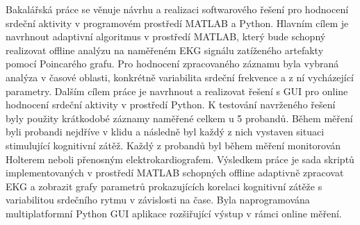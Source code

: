 Bakalářská práce se věnuje návrhu a realizaci softwarového řešení pro hodnocení
srdeční aktivity v programovém prostředí MATLAB a Python. Hlavním cílem je
navrhnout adaptivní algoritmus v prostředí MATLAB, který bude schopný realizovat
offline analýzu na naměřeném EKG signálu zatíženého artefakty pomocí Poincarého
grafu. Pro hodnocení zpracovaného záznamu byla vybraná analýza v časové oblasti,
konkrétně variabilita srdeční frekvence a z ní vycházející parametry. Dalším
cílem práce je navrhnout a realizovat řešení s GUI pro online hodnocení srdeční
aktivity v prostředí Python. K testování navrženého řešení byly použity
krátkodobé záznamy naměřené celkem u 5 probandů. Během měření byli probandi
nejdříve v klidu a následně byl každý z nich vystaven situaci stimulující
kognitivní zátěž. Každý z probandů byl během měření monitorován Holterem neboli
přenosným elektrokardiografem. Výsledkem práce je sada skriptů implementovaných
v prostředí MATLAB schopných offline adaptivně zpracovat EKG a zobrazit grafy
parametrů prokazujících korelaci kognitivní zátěže s variabilitou srdečního
rytmu v závislosti na čase. Byla naprogramována multiplatformní Python GUI
aplikace rozšiřující výstup v rámci online měření. 

